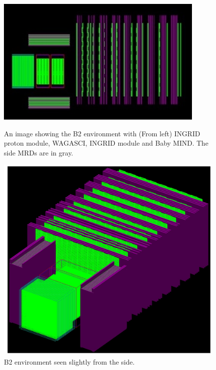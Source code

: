 \begin{figure}[h!]
  \centering
  \begin{minipage}[b]{0.59\textwidth}
    \includegraphics[width=\textwidth]{figures/B2Top.jpeg}
    \vspace{2mm}
    \caption{An image showing the B2 environment with (From left) INGRID proton module, WAGASCI, INGRID module and Baby MIND. The side MRDs are in gray.}
    \label{fig:B2environ}
  \end{minipage}
  \hfill
  \begin{minipage}[b]{0.39\textwidth}
    \includegraphics[width=\textwidth]{figures/B2SideUp.jpeg}
       \vspace{2mm}
    \caption{B2 environment seen slightly from the side.}
     \label{fig:B2environ2}
  \end{minipage}
\end{figure}

